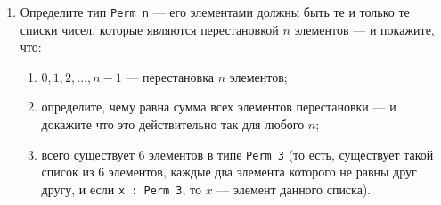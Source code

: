 \documentclass[10pt,a4paper,oneside]{article}
\begin{document}
\begin{enumerate}
\item Определите тип \verb!Perm n! --- его элементами должны быть те и только те списки чисел, которые являются перестановкой
$n$ элементов --- и покажите, что:
\begin{enumerate}
\item $0,1,2,\dots,n-1$ --- перестановка $n$ элементов;
\item определите, чему равна сумма всех элементов перестановки --- и докажите что это действительно так для любого $n$;
\item всего существует $6$ элементов в типе \verb!Perm 3! (то есть, существует такой список из 6 элементов,
каждые два элемента которого не равны друг другу, и если \verb!x : Perm 3!, то $x$ --- элемент данного списка).
\end{enumerate}
\end{enumerate}
\end{document}
